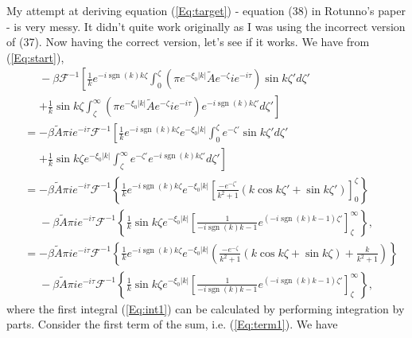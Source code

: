\documentclass[12pt]{article}
\DeclareMathOperator{\sgn}{sgn}
\begin{document}
My attempt at deriving equation (\ref{Eq:target}) - equation (38) in Rotunno's paper - is very messy. It didn't quite work originally as I was using the incorrect version of (37). Now having the correct version, let's see if it works. We have from (\ref{Eq:start}),
\begin{align}
&\phantom{=} -\beta \mathcal{F}^{-1}\left[ \frac{1}{k} e^{-i\sgn(k) k \zeta} \int_0^\zeta \left(\pi e^{-\xi_0 |k|} \tilde{A} e^{-\zeta} i e^{-i\tau} \right) \sin k\zeta' d\zeta' \right. \\
& \phantom{=} \left. + \frac{1}{k} \sin k \zeta \int_\zeta^\infty \left(\pi e^{-\xi_0 |k|} \tilde{A} e^{-\zeta} i e^{-i\tau} \right) e^{-i\sgn(k)k\zeta'} d\zeta' \right] \\
& = -\beta \tilde{A} \pi i e^{-i\tau} \mathcal{F}^{-1} \left[ \frac{1}{k} e^{-i\sgn(k) k \zeta} e^{-\xi_0 |k|} \int_0^\zeta e^{-\zeta'} \sin k\zeta' d\zeta' \right. \\
& \phantom{=} \left.  + \frac{1}{k} \sin k \zeta e^{-\xi_0 |k|} \int_\zeta^\infty e^{-\zeta'} e^{-i\sgn(k)k\zeta'} d\zeta' \right]  \\
& =-\beta \tilde{A} \pi i e^{-i\tau} \mathcal{F}^{-1} \left\{ \frac{1}{k} e^{-i\sgn(k) k \zeta} e^{-\xi_0 |k|}   \left[ \frac{-e^{-\zeta'}}{k^2+1}\left(k\cos k\zeta' + \sin k\zeta' \right)\right]_0^\zeta \right\} \label{Eq:int1} \\
& \phantom{=} -\beta\tilde{A} \pi i e^{-i\tau} \mathcal{F}^{-1}\left\{\frac{1}{k} \sin k \zeta e^{-\xi_0 |k|} \left[ \frac{1}{-i\sgn(k)k-1}e^{\left(-i\sgn(k)k-1\right)\zeta'} \right]_\zeta^\infty \right\}, \\
& =-\beta \tilde{A} \pi i e^{-i\tau} \mathcal{F}^{-1} \left\{ \frac{1}{k} e^{-i\sgn(k) k \zeta} e^{-\xi_0 |k|}   \left( \frac{-e^{-\zeta}}{k^2+1}\left(k\cos k\zeta + \sin k\zeta \right) + \frac{k}{k^2+1} \right) \right\} \label{Eq:term1} \\
& \phantom{=} -\beta \tilde{A} \pi i e^{-i\tau} \mathcal{F}^{-1}\left\{ \frac{1}{k} \sin k \zeta e^{-\xi_0 |k|} \left[ \frac{1}{-i\sgn(k)k-1}e^{\left(-i\sgn(k)k-1\right)\zeta'} \right]_\zeta^\infty \right\},
\end{align}
where the first integral (\ref{Eq:int1}) can be calculated by performing integration by parts. Consider the first term of the sum, i.e. (\ref{Eq:term1}). We have
\end{document}
